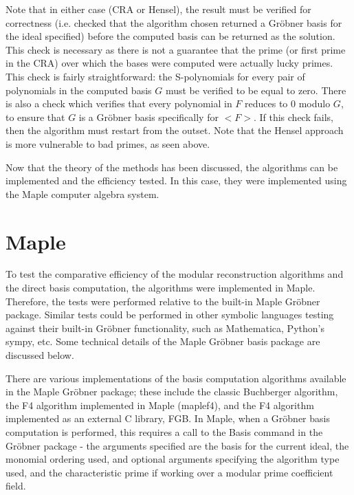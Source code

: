 \documentclass[letterpaper,12pt,titlepage,oneside,final]{book}
\begin{document}
Note that in either case (CRA or Hensel), the result must be verified for correctness (i.e. checked that the algorithm chosen returned a Gr\"obner basis for the ideal specified) before the computed basis can be returned as the solution.  This check is necessary as there is not a guarantee that the prime (or first prime in the CRA) over which the bases were computed were actually lucky primes.  This check is fairly straightforward: the S-polynomials for every pair of polynomials in the computed basis ${G}$ must be verified to be equal to zero.  There is also a check which verifies that every polynomial in $F$ reduces to 0 modulo $G$, to ensure that $G$ is a Gr\"obner basis specifically for $<F>$.  If this check fails, then the algorithm must restart from the outset.  Note that the Hensel approach is more vulnerable to bad primes, as seen above.

Now that the theory of the methods has been discussed, the algorithms can be implemented and the efficiency tested.  In this case, they were implemented using the Maple computer algebra system.

\section{Maple}

To test the comparative efficiency of the modular reconstruction algorithms and the direct basis computation, the algorithms were implemented in Maple.  Therefore, the tests were performed relative to the built-in Maple Gr\"obner package.  Similar tests could be performed in other symbolic languages testing against their built-in Gr\"obner functionality, such as Mathematica, Python's sympy, etc.  Some technical details of the Maple Gr\"obner basis package are discussed below.

There are various implementations of the basis computation algorithms available in the Maple Gr\"obner package; these include the classic Buchberger algorithm, the F4 algorithm implemented in Maple (maplef4), and the F4 algorithm implemented as an external C library, FGB.  In Maple, when a Gr\"obner basis computation is performed, this requires a call to the Basis command in the Gr\"obner package - the arguments specified are the basis for the current ideal, the monomial ordering used, and optional arguments specifying the algorithm type used, and the characteristic prime if working over a modular prime coefficient field.   
\end{document}
